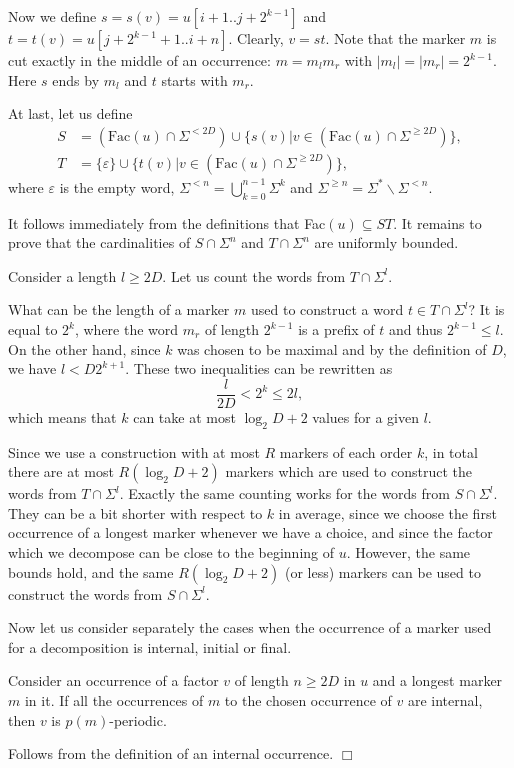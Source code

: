 \documentclass[runningheads,envcountsect,envcountsame]{llncs}
\begin{document}
Now we define $s=s(v)=u[i+1..j+2^{k-1}]$ and $t=t(v)=u[j+2^{k-1}+1..i+n]$. Clearly, $v=st$. Note that the marker $m$ is cut exactly in the middle of an occurrence: $m=m_l m_r$ with $|m_l|=|m_r|=2^{k-1}$. Here $s$ ends by $m_l$ and $t$
starts with $m_r$.

At last, let us define
\begin{align*}
S&=(\mbox{Fac}(u) \cap \Sigma^{< 2D}) \cup \{s(v)|v \in (\mbox{Fac}(u) \cap \Sigma^{\geq 2D})\}, \\
T&=\{\varepsilon\} \cup \{t(v)|v \in (\mbox{Fac}(u) \cap \Sigma^{\geq 2D})\},
\end{align*}
where $\varepsilon$ is the empty word, $\Sigma^{< n}=\bigcup_{k=0}^{n-1} \Sigma^k$ and $\Sigma^{\geq n}=\Sigma^* \backslash \Sigma^{<n}$.

It follows immediately from the definitions that Fac$(u)\subseteq ST$. It remains to prove that the cardinalities of $S \cap \Sigma^n$ and $T\cap \Sigma^n$ are uniformly bounded.

Consider a length $l\geq 2 D$. Let us count the words from $T\cap \Sigma^l$.

What can be the length of a marker $m$ used to construct a word $t \in T \cap \Sigma^l$? It is equal to $2^k$, where the word $m_r$ of length $2^{k-1}$ is a prefix of $t$ and thus $2^{k-1} \leq l$. On the other hand, since $k$ was chosen to be maximal and by the definition of $D$, we have $l<D 2^{k+1}$. These two inequalities can be rewritten as
\begin{equation}\label{e:kl}
 \frac{l}{2D}<2^k\leq 2l,
\end{equation}
which means that $k$ can take at most $\log_2D+2$ values for a given $l$.

Since we use a construction with at most $R$ markers of each order $k$, in total there are at most $R(\log_2D+2)$ markers which are used to construct the words from $T \cap \Sigma^l$. Exactly the same counting works for the words from $S \cap \Sigma^l$. They can be a bit shorter with respect to $k$ in average, since we choose the first occurrence of a longest marker whenever we have a choice, and since the factor which we decompose can be close to the beginning of $u$. However, the same bounds hold, and the same $R(\log_2D+2)$ (or less) markers can be used to construct the words from $S\cap \Sigma^l$.

Now let us consider separately the cases when the occurrence of a marker used for a decomposition is internal, initial or final.

\begin{lemma}
Consider an occurrence of a factor $v$ of length $n \geq 2D$ in $u$ and a longest marker $m$ in it. If all the occurrences of $m$ to the chosen occurrence of $v$ are internal, then $v$ is $p(m)$-periodic.
\end{lemma}
 Follows from the definition of an internal occurrence. \hfill $\Box$
\end{document}
